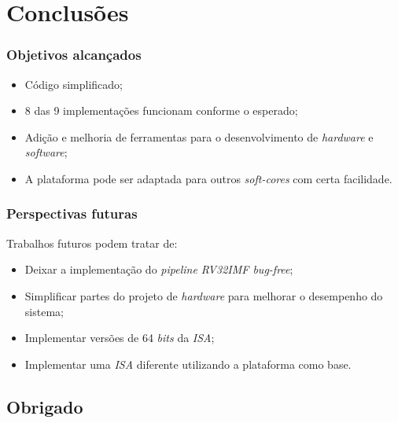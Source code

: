 \documentclass[aspectratio=169]{beamer}
\begin{document}
\section{Conclusões}
    \begin{frame}
        \frametitle{Objetivos alcançados}
        \vfill
        \begin{itemize}
            \item Código simplificado;
            \item 8 das 9 implementações funcionam conforme o esperado;
            \item Adição e melhoria de ferramentas para o desenvolvimento de \textit{hardware} e \textit{software};
            \item A plataforma pode ser adaptada para outros \textit{soft-cores} com certa facilidade.
        \end{itemize}
        \vfill
    \end{frame}

    \begin{frame}
        \vfill
        \frametitle{Perspectivas futuras}
        {Trabalhos futuros podem tratar de:}
        \begin{itemize}
            \item Deixar a implementação do \textit{pipeline RV32IMF bug-free};
            \item Simplificar partes do projeto de \textit{hardware} para melhorar o desempenho do sistema;
            \item Implementar versões de 64 \textit{bits} da \textit{ISA};
            \item Implementar uma \textit{ISA} diferente utilizando a plataforma como base.
        \end{itemize}
        \vfill
    \end{frame}

    \subsection{Obrigado}
\end{document}

